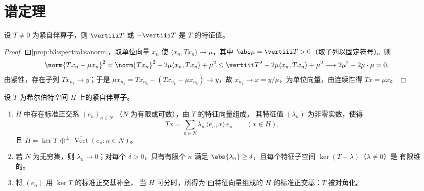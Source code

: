 \section{谱定理}

\begin{lemma}[存在极端特征值]
\label{lem:b3:spectral:existence}
设 $T \neq 0$ 为紧自伴算子，则 $\vertiii T$
或 $-\vertiii T$ 是 $T$ 的特征值。
\end{lemma}

\begin{proof}
由\cref{prop:b3:spectral:sanorm}，取单位向量 $x_n$
使 $\langle x_n, Tx_n\rangle \to \mu$，其中 $\abs\mu =
\vertiii T > 0$（取子列以固定符号）。则
\[
\norm{Tx_n - \mu x_n}^2
= \norm{Tx_n}^2 - 2\mu\langle x_n, Tx_n\rangle + \mu^2
\leq \vertiii T^2 - 2\mu\langle x_n, Tx_n\rangle + \mu^2
\longrightarrow 2\mu^2 - 2\mu\cdot\mu = 0 .
\]
由紧性，存在子列 $Tx_{n_k} \to y$；于是 $\mu
x_{n_k} = Tx_{n_k} - (Tx_{n_k} - \mu x_{n_k}) \to y$，故
$x_{n_k} \to x = y/\mu$，为单位向量，由连续性得
$Tx = \mu x$。
\end{proof}

\begin{theorem}[紧自伴算子的谱定理
]\label{thm:b3:spectral:spectral}
设 $T$ 为希尔伯特空间
$H$ 上的紧自伴算子。
\begin{enumerate}
  \item $H$ 中存在标准正交系 $(e_n)_{n \in N}$
        （$N$ 为有限或可数），由 $T$ 的特征向量组成，
        其特征值 $(\lambda_n)$ 为非零实数，使得
        \[
        Tx = \sum_{n\in N}\lambda_n\,\langle e_n, x\rangle\,
        e_n \qquad (x \in H),
        \]
        且 $H = \ker T \,\oplus^\perp\,
        \overline{\operatorname{Vect}}(e_n : n \in N)$。
  \item 若 $N$ 为无穷集，则 $\lambda_n \to 0$；对每个
        $\delta > 0$，只有有限个 $n$ 满足
        $\abs{\lambda_n} \geq \delta$，且每个特征子空间
        $\ker(T - \lambda)$（$\lambda \neq 0$）是
        有限维的。
  \item 将 $(e_n)$ 用 $\ker T$ 的标准正交基补全，
        当 $H$ 可分时，所得为
        由特征向量组成的 $H$ 的标准正交基：$T$ 被对角化。
\end{enumerate}
\end{theorem}

